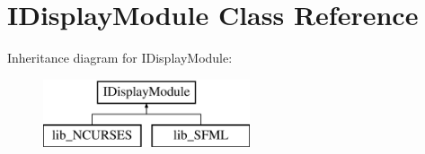 \section{I\+Display\+Module Class Reference}
\label{class_i_display_module}
Inheritance diagram for I\+Display\+Module\+:\begin{figure}[H]
\begin{center}
\leavevmode
\includegraphics[height=2.000000cm]{class_i_display_module}
\end{center}
\end{figure}
